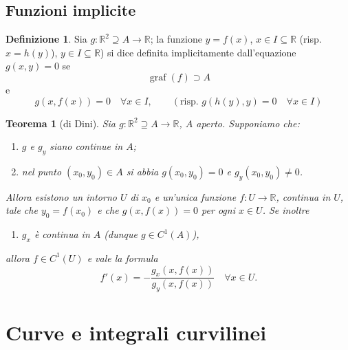\documentclass[a4paper]{book}
\makeatletter
\DeclareMathOperator{\graf}{graf}
\newcommand{\skipitems}[1]{%
  \addtocounter{\@enumctr}{#1}%
}
\numberwithin{equation}{section}
\theoremstyle{plain}
\newtheorem{teor}{Teorema}[section]
\theoremstyle{definition}
\newtheorem{defn}{Definizione}[section]
\theoremstyle{remark}
\theoremstyle{example}
\makeatother
\begin{document}
\section{Funzioni implicite}

\begin{defn}
	Sia $g\colon\mathbb{R}^2 \supseteq A \rightarrow \mathbb{R}$; la funzione $y=f(x)$, $x \in I \subseteq \mathbb{R}$ (risp. $x = h(y)$), $y \in I \subseteq \mathbb{R}$) si dice definita implicitamente dall'equazione $g(x,y) = 0$ se
	\begin{equation}
		\graf(f) \supset A
	\end{equation}
	e
	\begin{equation*}
		g(x,f(x)) = 0 \quad \forall x \in I, \qquad  (\text{risp. } g(h(y),y) = 0 \quad \forall x \in I)
	\end{equation*}
\end{defn}

\begin{teor} [di Dini] Sia $g\colon\mathbb{R}^2 \supseteq A \rightarrow \mathbb{R}$, $A$ aperto. Supponiamo che:
	\begin{enumerate}
		\item $g$ e $g_y$ siano continue in $A$;
		\item nel punto $(x_0,y_0) \in A$ si abbia $g(x_0,y_0) = 0$ e $g_y(x_0,y_0) \neq 0$.
	\end{enumerate}
		Allora esistono un intorno $U$ di $x_0$ e un'unica funzione $f \colon U \rightarrow \mathbb{R}$, continua in $U$, tale che $y_0 = f(x_0)$ e che $g(x,f(x)) = 0$ per ogni $x \in U$. Se inoltre
		 	\begin{enumerate} \skipitems{2}
				\item $g_x$ è continua in $A$ (dunque $g \in C^1(A)$),
			\end{enumerate}
		allora $f \in C^1(U)$ e vale la formula
	\begin{equation}
		f'(x) = - \frac{g_x(x,f(x))}{g_y(x,f(x))} \quad \forall x \in U.
	\end{equation}

\end{teor}









\chapter{Curve e integrali curvilinei}
\end{document}
